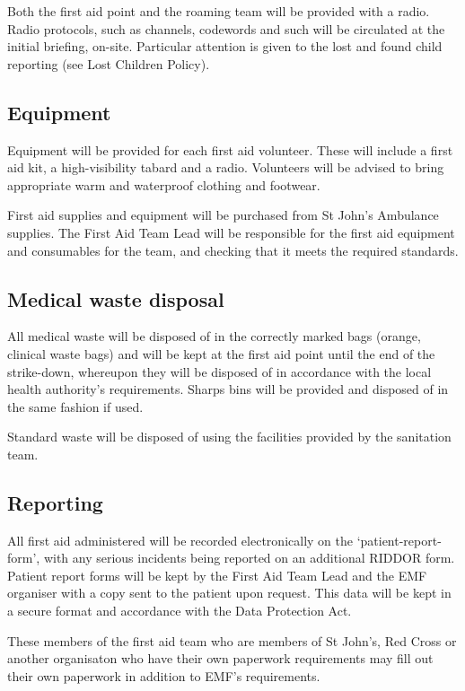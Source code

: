 Both the first aid point and the roaming team will be provided with a radio.
Radio protocols, such as channels, codewords and such will be circulated at the
initial briefing, on-site. Particular attention is given to the lost and found
child reporting (see Lost Children Policy).

\subsection{Equipment}
Equipment will be provided for each first aid volunteer. These will include a
first aid kit, a high-visibility tabard and a radio. Volunteers will be advised
to bring appropriate warm and waterproof clothing and footwear.

First aid supplies and equipment will be purchased from St John's Ambulance
supplies. The First Aid Team Lead will be responsible for the first aid
equipment and consumables for the team, and checking that it meets the required
standards.

\subsection{Medical waste disposal}
All medical waste will be disposed of in the correctly marked bags (orange,
clinical waste bags) and will be kept at the first aid point until the end of
the strike-down, whereupon they will be disposed of in accordance with the
local health authority's requirements. Sharps bins will be provided and
disposed of in the same fashion if used.

Standard waste will be disposed of using the facilities provided by the sanitation team.

\subsection{Reporting}
All first aid administered will be recorded electronically on the
‘patient-report-form', with any serious incidents being reported on an
additional RIDDOR form. Patient report forms will be kept by the First Aid Team
Lead and the EMF organiser with a copy sent to the patient upon request. This
data will be kept in a secure format and accordance with the Data Protection
Act.

These members of the first aid team who are members of St John's, Red Cross or another
organisaton who have their own paperwork requirements may fill out their own paperwork
in addition to EMF's requirements.

